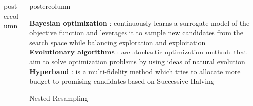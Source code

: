 \documentclass{beamer}
\newlength{\columnheight} %
\begin{document}
\begin{frame}[fragile]{}
\begin{columns}
\begin{column}{.31\textwidth}
\begin{beamercolorbox}[center]{postercolumn}
\begin{minipage}{.98\textwidth}
{%
				}
			\end{minipage}
		\end{beamercolorbox}
	\end{column}
	\begin{column}{.31\textwidth}
		\begin{beamercolorbox}[center]{postercolumn}
			\begin{minipage}{.98\textwidth}
				\parbox[t][\columnheight]{\textwidth}{



\textbf{Bayesian optimization} : continuously learns a surrogate model of the objective function and leverages it to sample new candidates from the search space while balancing exploration and exploitation\\

\textbf{Evolutionary algorithms} : are stochastic optimization methods that aim to solve optimization problems by using ideas of natural evolution\\

\textbf{Hyperband} : is a multi-fidelity method which tries to allocate more budget to promising candidates based on Successive Halving \\

\begin{myblock}{Nested Resampling}


\end{myblock}}
\end{minipage}
\end{beamercolorbox}
\end{column}
\end{columns}
\end{frame}
\end{document}
